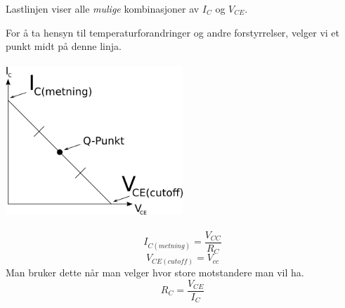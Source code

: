 Lastlinjen viser alle \emph{mulige} kombinasjoner av $I_C$ og $V_{CE}$.

For å ta hensyn til temperaturforandringer og andre forstyrrelser,
velger vi et punkt midt på denne linja.
\\\\
\includegraphics[width=0.5\textwidth]{./img/lastlinje}
\\\\
$$I_{C(metning)} = \frac{V_{CC}}{R_C}$$
$$V_{CE(cutoff)} = V_{cc}$$
Man bruker dette når man velger hvor store motstandere man vil ha.
$$R_C = \frac{V_{CE}}{I_C}$$
